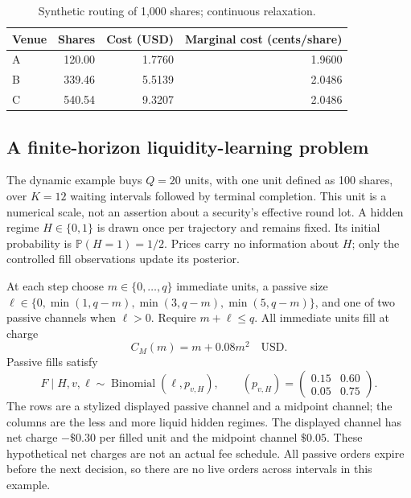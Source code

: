 \documentclass[11pt]{article}
\numberwithin{equation}{section}
\theoremstyle{definition}
\theoremstyle{remark}
\theoremstyle{definition}
\newcommand{\Pp}{\mathbb P}
\begin{document}
\begin{table}[tb]
\centering
\caption{Synthetic routing of 1,000 shares; continuous relaxation.}
\label{tab:routing}
\begin{tabular}{lrrr}
\toprule Venue & Shares & Cost (USD) & Marginal cost (cents/share) \\\midrule
A & 120.00 & 1.7760 & 1.9600 \\
B & 339.46 & 5.5139 & 2.0486 \\
C & 540.54 & 9.3207 & 2.0486 \\

\bottomrule
\end{tabular}
\end{table}

\subsection{A finite-horizon liquidity-learning problem}

The dynamic example buys $Q=20$ units, with one unit defined as 100 shares,
over $K=12$ waiting intervals followed by terminal completion. This unit is
a numerical scale, not an assertion about a security's effective round lot.
A hidden regime $H\in\{0,1\}$ is drawn once per trajectory and remains fixed.
Its initial probability is $\Pp(H=1)=1/2$. Prices carry no information about
$H$; only the controlled fill observations update its posterior.

At each step choose $m\in\{0,\ldots,q\}$ immediate units, a passive size
$\ell\in\{0,\min(1,q-m),\min(3,q-m),\min(5,q-m)\}$, and one of two
passive channels when $\ell>0$. Require $m+\ell\leq q$. All immediate units
fill at charge
\begin{equation}\label{eq:simmarket}
 C_M(m)=m+0.08m^2\quad\text{USD}.
\end{equation}
Passive fills satisfy
\begin{equation}\label{eq:simfill}
 F\mid H,v,\ell\sim\operatorname{Binomial}(\ell,p_{v,H}),\qquad
 (p_{v,H})=\begin{pmatrix}0.15&0.60\\0.05&0.75\end{pmatrix}.
\end{equation}
The rows are a stylized displayed passive channel and a midpoint channel;
the columns are the less and more liquid hidden regimes. The displayed
channel has net charge $-\$0.30$ per filled unit and the midpoint channel
$\$0.05$. These hypothetical net charges are not an actual fee schedule.
All passive orders expire before the next decision, so there are no live
orders across intervals in this example.
\end{document}
